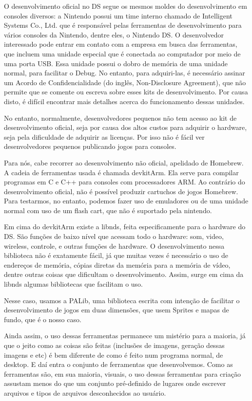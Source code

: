 \documentclass[brazil]{abnt}
\begin{document}
O desenvolvimento oficial no DS segue os mesmos moldes do desenvolvimento em consoles diversos: a Nintendo possui um time interno chamado de Intelligent Systems Co., Ltd. que é responsável pelas ferramentas de desenvolvimento para vários consoles da Nintendo, dentre eles, o Nintendo DS. O desenvolvedor interessado pode entrar em contato com a empresa em busca das ferramentas, que incluem uma unidade especial que é conectada ao computador por meio de uma porta USB. Essa unidade possui o dobro de memória de uma unidade normal, para facilitar o Debug. No entanto, para adquiri-las, é necessário assinar um Acordo de Confidencialidade (do inglês, Non-Disclosure Agreement), que não permite que se comente ou escreva sobre esses kits de desenvolvimento. Por causa disto, é difícil encontrar mais detalhes acerca do funcionamento dessas unidades.

No entanto, normalmente, desenvolvedores pequenos não tem acesso ao kit de desenvolvimento oficial, seja por causa dos altos custos para adquirir o hardware, seja pela dificuldade de adquirir as licenças. Por isso não é fácil ver desenvolvedores pequenos publicando jogos para consoles.

Para nós, cabe recorrer ao desenvolvimento não oficial, apelidado de Homebrew. A cadeia de ferramentas usada é chamada devkitArm. Ela serve para compilar programas em C e C++ para consoles com processadores ARM. Ao contrário do desenvolvimento oficial, não é possível produzir cartuchos de jogos Homebrew. Para testarmos, no entanto, podemos fazer uso de emuladores ou de uma unidade normal com uso de um flash cart, que não é suportado pela nintendo.

Em cima do devkitArm existe a libnds, feita especificamente para o hardware do DS. São funções de baixo nível que acessam todo o hardware: som, video, wireless, controle, e outras funções de hardware. O desenvolvimento nessa biblioteca não é exatamente fácil, já que muitas vezes é necessário o uso de endereços de memória, cópias diretas da memória para a memória de vídeo, dentre outras coisas que dificultam o desenvolvimento. Assim, surge em cima da libnds algumas bibliotecas que facilitam o uso.

Nesse caso, usamos a PALib, uma biblioteca escrita com intenção de facilitar o desenvolvimento de jogos em duas dimensões, que usem Sprites e mapas de fundo, que é o nosso caso.

Ainda assim, o uso dessas ferramentas permanece um mistério para a maioria, já que o jeito como as coisas são feitas (inclusões de imagens, geração dessas imagens e etc) é bem diferente de como é feito num programa normal, de desktop. E daí entra o conjunto de ferramentas que desenvolvemos. Como as ferramentas são, em sua maioria, visuais, o uso dessas ferramentas para criação assustam menos do que um conjunto pré-definido de lugares onde escrever arquivos e tipos de arquivos desconhecidos ao usuário.
\end{document}

